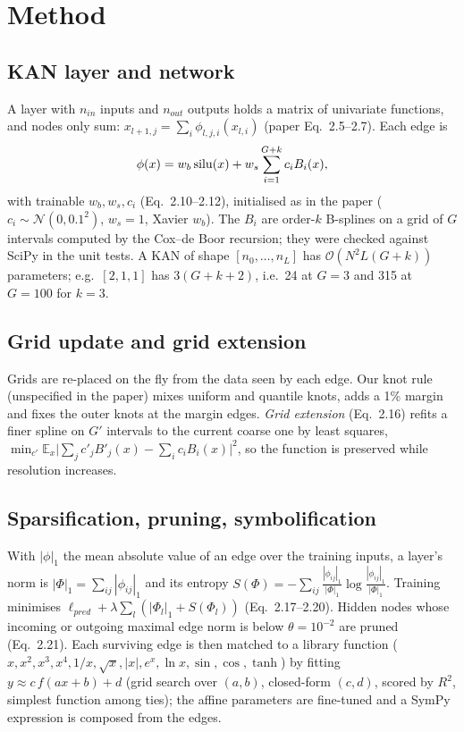 \section{Method}
\subsection{KAN layer and network}
A layer with $n_{in}$ inputs and $n_{out}$ outputs holds a matrix of univariate functions, and nodes only sum: $x_{l+1,j}=\sum_i\phi_{l,j,i}(x_{l,i})$ (paper Eq.~2.5--2.7). Each edge is
\begin{equation}
\phi(x)=w_b\,\mathrm{silu}(x)+w_s\sum_{i=1}^{G+k}c_i B_i(x),
\end{equation}
with trainable $w_b,w_s,c_i$ (Eq.~2.10--2.12), initialised as in the paper ($c_i\!\sim\!\mathcal N(0,0.1^2)$, $w_s=1$, Xavier $w_b$). The $B_i$ are order-$k$ B-splines on a grid of $G$ intervals computed by the Cox--de Boor recursion; they were checked against SciPy in the unit tests. A KAN of shape $[n_0,\dots,n_L]$ has $\mathcal O(N^2L(G+k))$ parameters; e.g.\ $[2,1,1]$ has $3(G+k+2)$, i.e.\ 24 at $G{=}3$ and 315 at $G{=}100$ for $k{=}3$.

\subsection{Grid update and grid extension}
Grids are re-placed on the fly from the data seen by each edge. Our knot rule (unspecified in the paper) mixes uniform and quantile knots, adds a 1\% margin and fixes the outer knots at the margin edges. \emph{Grid extension} (Eq.~2.16) refits a finer spline on $G'$ intervals to the current coarse one by least squares, $\min_{c'}\mathbb E_x\big|\sum_j c'_jB'_j(x)-\sum_i c_iB_i(x)\big|^2$, so the function is preserved while resolution increases.

\subsection{Sparsification, pruning, symbolification}
With $|\phi|_1$ the mean absolute value of an edge over the training inputs, a layer's norm is $|\Phi|_1=\sum_{ij}|\phi_{ij}|_1$ and its entropy $S(\Phi)=-\sum_{ij}\frac{|\phi_{ij}|_1}{|\Phi|_1}\log\frac{|\phi_{ij}|_1}{|\Phi|_1}$. Training minimises $\ell_{pred}+\lambda\sum_l(|\Phi_l|_1+S(\Phi_l))$ (Eq.~2.17--2.20). Hidden nodes whose incoming or outgoing maximal edge norm is below $\theta{=}10^{-2}$ are pruned (Eq.~2.21). Each surviving edge is then matched to a library function ($x,x^2,x^3,x^4,1/x,\sqrt x,|x|,e^x,\ln x,\sin,\cos,\tanh$) by fitting $y\approx c\,f(ax{+}b)+d$ (grid search over $(a,b)$, closed-form $(c,d)$, scored by $R^2$, simplest function among ties); the affine parameters are fine-tuned and a SymPy expression is composed from the edges.

